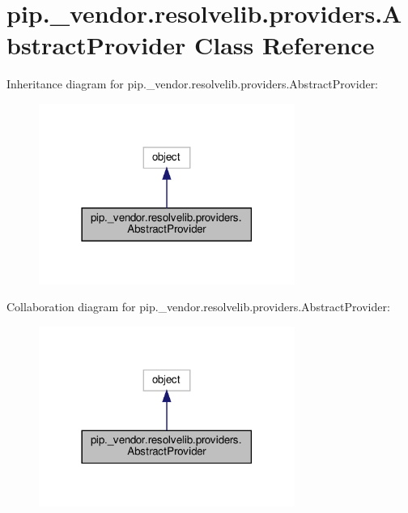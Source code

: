 \hypertarget{classpip_1_1__vendor_1_1resolvelib_1_1providers_1_1AbstractProvider}{}\section{pip.\+\_\+vendor.\+resolvelib.\+providers.\+Abstract\+Provider Class Reference}
\label{classpip_1_1__vendor_1_1resolvelib_1_1providers_1_1AbstractProvider}


Inheritance diagram for pip.\+\_\+vendor.\+resolvelib.\+providers.\+Abstract\+Provider\+:
\nopagebreak
\begin{figure}[H]
\begin{center}
\leavevmode
\includegraphics[width=237pt]{classpip_1_1__vendor_1_1resolvelib_1_1providers_1_1AbstractProvider__inherit__graph}
\end{center}
\end{figure}


Collaboration diagram for pip.\+\_\+vendor.\+resolvelib.\+providers.\+Abstract\+Provider\+:
\nopagebreak
\begin{figure}[H]
\begin{center}
\leavevmode
\includegraphics[width=237pt]{classpip_1_1__vendor_1_1resolvelib_1_1providers_1_1AbstractProvider__coll__graph}
\end{center}
\end{figure}
